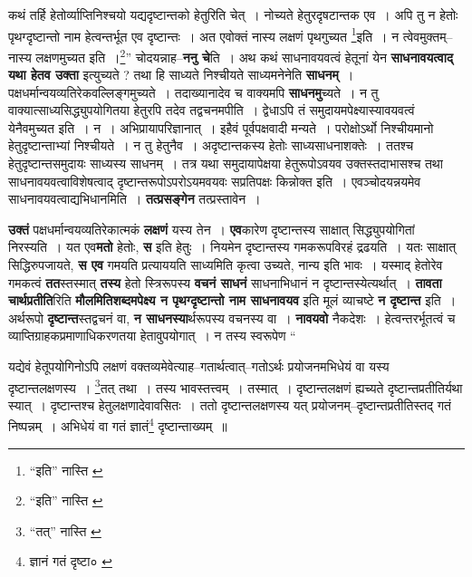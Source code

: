 \documentclass[article,12pt,a4paper]{memoir}
\begin{document}
	कथं तर्हि हेतोर्व्याप्तिनिश्चयो यद्यदृष्टान्तको हेतुरिति चेत् । नोच्यते हेतुरदृषटान्तक एव । अपि तु न हेतोः पृथग्दृष्टान्तो नाम हेत्वन्तर्भूत एव दृष्टान्तः । अत एवोक्तं नास्य लक्षणं पृथगुच्यत \footnote{“इति” नास्ति \cite{dp-msB} \cite{dp-msD}}\-इति । न त्वेवमुक्तम्--नास्य लक्षणमुच्यत इति ।\footnote{“इति” नास्ति \cite{dp-msB}}” चोदयन्नाह--\textbf{ननु चे}ति । अथ कथं साधनावयवत्वं हेतूनां येन \textbf{साधनावयत्वाद् यथा हेतव उक्ता} इत्युच्यते ? तथा हि साध्यते निश्चीयते साध्यमनेनेति \textbf{साधनम्} । पक्षधर्मान्वयव्यतिरेकवल्लिङ्गमुच्यते । तदाख्यानादेव च वाक्यमपि \textbf{साधनमु}च्यते । न तु वाक्यात्साध्यसिद्ध्युपयोगितया हेतुरपि तदेव तद्वचनमपीति । द्वेधाऽपि तं समुदायमपेक्ष्यास्यावयवत्वं येनैवमुच्यत इति । न । अभिप्रायापरिज्ञानात् । इहैवं पूर्वपक्षवादी मन्यते । परोक्षोऽर्थो निश्चीयमानो हेतुदृष्टान्ताभ्यां निश्चीयते । न तु हेतुनैव । अदृष्टान्तकस्य हेतोः साध्यसाधनाशक्तेः । ततश्च हेतुदृष्टान्तसमुदायः साध्यस्य साधनम् । तत्र यथा समुदायापेक्षया हेतुरूपोऽवयव उक्तस्तदाभासश्च तथा साधनावयवत्वाविशेषत्वाद् दृष्टान्तरूपोऽपरोऽयमवयवः सप्रतिपक्षः किन्नोक्त इति । एवञ्चोदयन्नयमेव साधनावयवत्वाद्यभिधानमिति । \textbf{तत्प्रसङ्गेन} तत्प्रस्तावेन ।
	\pend
      

	  \pstart \textbf{उक्तं} पक्षधर्मान्वयव्यतिरेकात्मकं \textbf{लक्षणं} यस्य तेन । \textbf{एव}कारेण दृष्टान्तस्य साक्षात् सिद्ध्युपयोगितां निरस्यति । यत एव\textbf{मतो} हेतोः, \textbf{स} इति हेतुः । नियमेन दृष्टान्तस्य गमकरूपविरहं द्रढयति । यतः साक्षात् सिद्धिरुपजायते, \textbf{स एव} गमयति प्रत्याययति साध्यमिति कृत्वा उच्यते, नान्य इति भावः । यस्माद् हेतोरेव गमकत्वं \textbf{तत}स्तस्मात् \textbf{तस्य} हेतो स्त्रिरूपस्य \textbf{वचनं साधनं} साधनाभिधानं न दृष्टान्तस्येत्यर्थात् । \textbf{तावता चार्थप्रतीति}रिति \textbf{मौलमितिशब्दमपेक्ष्य न पृथग्दृष्टान्तो नाम साधनावयव} इति मूलं व्याचष्टे \textbf{न दृष्टान्त} इति । अर्थरूपो \textbf{दृष्टान्त}स्तद्वचनं वा, \textbf{न साधनस्या}र्थरूपस्य वचनस्य वा । \textbf{नावयवो} नैकदेशः । हेत्वन्तरर्भूतत्वं च व्याप्तिग्राहकप्रमाणाधिकरणतया हेतावुपयोगात् । न तस्य स्वरू\leavevmode{}पेण  \leavevmode{} “
	  
	यद्येवं हेतूपयोगिनोऽपि लक्षणं वक्तव्यमेवेत्याह--गतार्थत्वात्--गतोऽर्थः प्रयोजनमभिधेयं वा यस्य दृष्टान्तलक्षणस्य । \footnote{“तत्” नास्ति \cite{dp-edE} \cite{dp-edN}}\-तत् तथा । तस्य भावस्तत्त्वम् । तस्मात् । दृष्टान्तलक्षणं ह्यच्यते दृष्टान्तप्रतीतिर्यथा स्यात् । दृष्टान्तश्च हेतुलक्षणादेवावसितः । ततो दृष्टान्तलक्षणस्य यत् प्रयोजनम्--दृष्टान्तप्रतीतिस्तद् गतं निष्पन्नम् । अभिधेयं वा गतं ज्ञातं\footnote{ज्ञानं \cite{dp-msB} \cite{dp-edP} \cite{dp-edH} \cite{dp-edE} गतं दृष्टा० \cite{dp-msA}} दृष्टान्ताख्यम् ॥ 
	  
\end{document}
